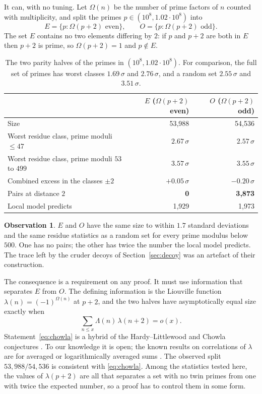 \documentclass[11pt]{article}
\theoremstyle{definition}
\newtheorem{observation}[theorem]{Observation}
\theoremstyle{remark}
\begin{document}
It can, with no tuning. Let $\Omega(n)$ be the number of prime factors of $n$
counted with multiplicity, and split the primes $p\in(10^8,1.02\cdot10^8)$ into
\[
E=\{p:\Omega(p+2)\text{ even}\},\qquad O=\{p:\Omega(p+2)\text{ odd}\}.
\]
The set $E$ contains no two elements differing by $2$: if $p$ and $p+2$ are both
in $E$ then $p+2$ is prime, so $\Omega(p+2)=1$ and $p\notin E$.

\begin{table}[h]
\centering
\begin{tabular}{lrr}
\toprule
 & $E$ ($\Omega(p+2)$ even) & $O$ ($\Omega(p+2)$ odd) \\
\midrule
Size & 53{,}988 & 54{,}536 \\
Worst residue class, prime moduli $\le47$ & $2.67\,\sigma$ & $2.57\,\sigma$ \\
Worst residue class, prime moduli $53$ to $499$ & $3.57\,\sigma$ & $3.55\,\sigma$ \\
Combined excess in the classes $\pm2$ & $+0.05\,\sigma$ & $-0.20\,\sigma$ \\
Pairs at distance $2$ & \textbf{0} & \textbf{3{,}873} \\
Local model predicts & 1{,}929 & 1{,}973 \\
\bottomrule
\end{tabular}
\caption{The two parity halves of the primes in $(10^8,1.02\cdot10^8)$. For
comparison, the full set of primes has worst classes $1.69\,\sigma$ and
$2.76\,\sigma$, and a random set $2.55\,\sigma$ and $3.51\,\sigma$.}
\label{tab:parity}
\end{table}

\begin{observation}\label{obs:parity}
$E$ and $O$ have the same size to within $1.7$ standard deviations and the same
residue statistics as a random set for every prime modulus below $500$. One has
no pairs; the other has twice the number the local model predicts. The trace
left by the cruder decoys of Section~\ref{sec:decoy} was an artefact of their
construction.
\end{observation}

The consequence is a requirement on any proof. It must use information that
separates $E$ from $O$. The defining information is the Liouville function
$\lambda(n)=(-1)^{\Omega(n)}$ at $p+2$, and the two halves have asymptotically
equal size exactly when
\begin{equation}\label{eq:chowla}
\sum_{n\le x}\Lambda(n)\,\lambda(n+2)=o(x).
\end{equation}
Statement~\eqref{eq:chowla} is a hybrid of the Hardy--Littlewood and Chowla
conjectures \cite{chowla}. To our knowledge it is open; the known results on
correlations of $\lambda$ are for averaged or logarithmically averaged sums
\cite{mr,tao}. The observed split $53{,}988/54{,}536$ is consistent with
\eqref{eq:chowla}. Among the statistics tested here, the values of
$\lambda(p+2)$ are all that separates a set with no twin primes from one with
twice the expected number, so a proof has to control them in some form.
\end{document}
